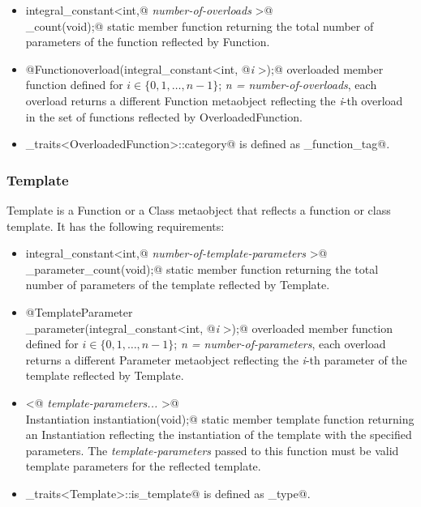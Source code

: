 \begin{itemize}

	\item{\verb@static integral_constant<int,@ {\em number-of-overloads}
	\verb@>@\\\verb@overload_count(void);@} static member function returning the total number
	of parameters of the function reflected by {\metaobject Function}.

	\item{\verb@static @{\metaobject Function}\verb@ overload(integral_constant<int, @{\em i}
	\verb@>);@} overloaded member function defined
	for $i \in \{0, 1, \dots, n-1\}$; {\em n = number-of-overloads},
	each overload returns a different {\metaobject Function} metaobject reflecting the {\em i}-th overload
	in the set of functions reflected by {\metaobject OverloadedFunction}.

	\item \verb@metaobject_traits<OverloadedFunction>::category@ is defined as 
	\verb@overloaded_function_tag@.
\end{itemize}

\subsubsection{Template}

{\metaobject Template} is a {\metaobject Function} or a {\metaobject Class} metaobject
that reflects a function or class template. It has the following requirements:

\begin{itemize}

	\item{\verb@static integral_constant<int,@ {\em number-of-template-parameters}
	\verb@>@\\\verb@template_parameter_count(void);@} static member function returning the total number
	of parameters of the template reflected by {\metaobject Template}.

	\item{\verb@static @{\metaobject TemplateParameter}\\\verb@template_parameter(integral_constant<int, @{\em i}
	\verb@>);@} overloaded member function defined
	for $i \in \{0, 1, \dots, n-1\}$; {\em n = number-of-parameters},
	each overload returns a different {\metaobject Parameter} metaobject reflecting the {\em i}-th parameter
	of the template reflected by {\metaobject Template}.

	\item{\verb@template <@ {\em template-parameters...} \verb@>@\\
	\verb@static Instantiation instantiation(void);@} static member template function returning an {\metaobject Instantiation}
	reflecting the instantiation of the template with the specified parameters. The {\em template-parameters} passed
	to this function must be valid template parameters for the reflected template.

	\item \verb@metaobject_traits<Template>::is_template@ is defined as \verb@true_type@.
\end{itemize}


